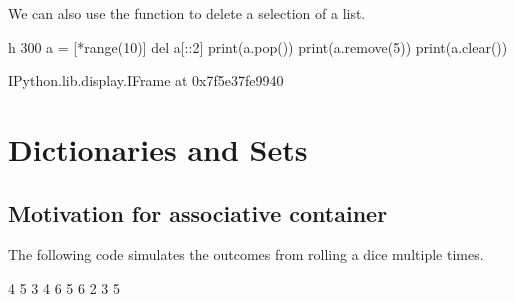 \documentclass[letterpaper,10pt,english]{sphinxmanual}
\begin{document}
We can also use the function  to delete a selection of a list.

\begin{sphinxVerbatim}[commandchars=\\\{\}]
 \PYGZhy{}h 300
a = [*range(10)]
del a[::2]
print(a.pop())
print(a.remove(5))
print(a.clear())
\end{sphinxVerbatim}

\begin{sphinxVerbatim}[commandchars=\\\{\}]
\PYGZlt{}IPython.lib.display.IFrame at 0x7f5e37fe9940\PYGZgt{}
\end{sphinxVerbatim}


\chapter{Dictionaries and Sets}
\label{\detokenize{Lecture8/Dictionaries and Sets:dictionaries-and-sets}}\label{\detokenize{Lecture8/Dictionaries and Sets::doc}}

\section{Motivation for associative container}
\label{\detokenize{Lecture8/Dictionaries and Sets:motivation-for-associative-container}}
The following code simulates the outcomes from rolling a dice multiple times.

\begin{sphinxVerbatim}[commandchars=\\\{\}]
 

  \PYG{p}{[}    \PYG{p}{]}
\end{sphinxVerbatim}

\begin{sphinxVerbatim}[commandchars=\\\{\}]
4 5 3 4 6 5 6 2 3 5
\end{sphinxVerbatim}

\end{document}
